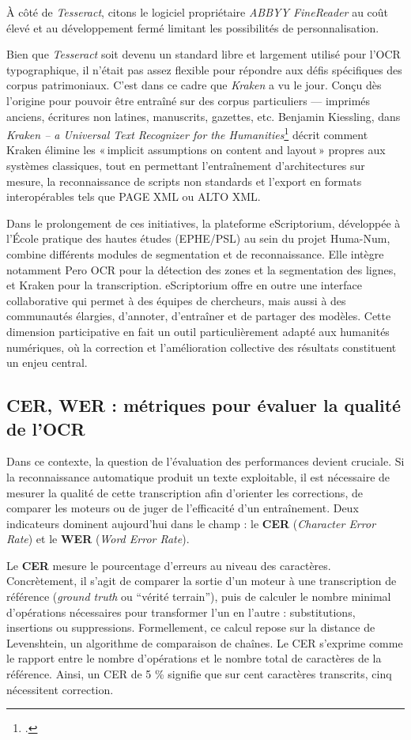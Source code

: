 À côté de \emph{Tesseract}, citons le logiciel propriétaire \emph{ABBYY FineReader} au coût élevé et au développement fermé limitant les possibilités de personnalisation.

Bien que \emph{Tesseract} soit devenu un standard libre et largement utilisé pour l’OCR typographique, il n’était pas assez flexible pour répondre aux défis spécifiques des corpus patrimoniaux. C’est dans ce cadre que \emph{Kraken} a vu le jour. Conçu dès l’origine pour pouvoir être entraîné sur des corpus particuliers — imprimés anciens, écritures non latines, manuscrits, gazettes, etc. Benjamin Kiessling, dans \emph{Kraken – a Universal Text Recognizer for the Humanities}\footcite[][]{kiessling} décrit comment Kraken élimine les « implicit assumptions on content and layout » propres aux systèmes classiques, tout en permettant l’entraînement d’architectures sur mesure, la reconnaissance de scripts non standards et l’export en formats interopérables tels que PAGE XML ou ALTO XML.

Dans le prolongement de ces initiatives, la plateforme eScriptorium, développée à l’École pratique des hautes études (EPHE/PSL) au sein du projet Huma-Num, combine différents modules de segmentation et de reconnaissance. Elle intègre notamment Pero OCR pour la détection des zones et la segmentation des lignes, et Kraken pour la transcription. eScriptorium offre en outre une interface collaborative qui permet à des équipes de chercheurs, mais aussi à des communautés élargies, d’annoter, d’entraîner et de partager des modèles. Cette dimension participative en fait un outil particulièrement adapté aux humanités numériques, où la correction et l’amélioration collective des résultats constituent un enjeu central.

\subsection{CER, WER : métriques pour évaluer la qualité de l'OCR}

Dans ce contexte, la question de l’évaluation des performances devient cruciale. Si la reconnaissance automatique produit un texte exploitable, il est nécessaire de mesurer la qualité de cette transcription afin d’orienter les corrections, de comparer les moteurs ou de juger de l’efficacité d’un entraînement. Deux indicateurs dominent aujourd’hui dans le champ : le \textbf{CER} (\emph{Character Error Rate}) et le \textbf{WER} (\emph{Word Error Rate}).

Le \textbf{CER} mesure le pourcentage d’erreurs au niveau des caractères. Concrètement, il s’agit de comparer la sortie d’un moteur à une transcription de référence (\emph{ground truth} ou \enquote{vérité terrain}), puis de calculer le nombre minimal d’opérations nécessaires pour transformer l’un en l’autre : substitutions, insertions ou suppressions. Formellement, ce calcul repose sur la distance de Levenshtein, un algorithme de comparaison de chaînes. Le CER s’exprime comme le rapport entre le nombre d’opérations et le nombre total de caractères de la référence. Ainsi, un CER de 5 \% signifie que sur cent caractères transcrits, cinq nécessitent correction.

